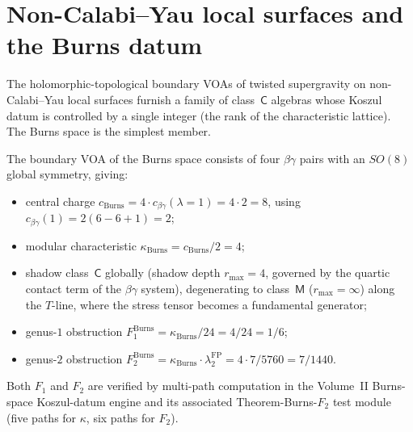 \section{Non-Calabi--Yau local surfaces and the Burns datum}
\label{sec:non-cy-local-surfaces}

The holomorphic-topological boundary VOAs of twisted supergravity
on non-Calabi--Yau local surfaces furnish a family of class~$\mathsf{C}$
algebras whose Koszul datum is controlled by a single integer
\textup{(}the rank of the characteristic lattice\textup{)}. The Burns
space is the simplest member.

\begin{computation}
\label{comp:burns-koszul-datum}
The boundary VOA of the Burns space consists of four $\beta\gamma$
pairs with an $SO(8)$ global symmetry, giving:
\begin{itemize}[nosep]
\item central charge $c_{\mathrm{Burns}}
 = 4 \cdot c_{\beta\gamma}(\lambda{=}1)
 = 4 \cdot 2 = 8$,
 using $c_{\beta\gamma}(1) = 2(6 - 6 + 1) = 2$;
\item modular characteristic
 $\kappa_{\mathrm{Burns}} = c_{\mathrm{Burns}}/2 = 4$;
\item shadow class~$\mathsf{C}$ globally \textup{(}shadow depth
 $r_{\max} = 4$, governed by the quartic contact term of the
 $\beta\gamma$ system\textup{)}, degenerating to class~$\mathsf{M}$
 \textup{(}$r_{\max} = \infty$\textup{)} along the $T$-line, where
 the stress tensor becomes a fundamental generator;
\item genus-$1$ obstruction
 $F_1^{\mathrm{Burns}} = \kappa_{\mathrm{Burns}}/24 = 4/24 = 1/6$;
\item genus-$2$ obstruction
 $F_2^{\mathrm{Burns}} = \kappa_{\mathrm{Burns}} \cdot
 \lambda_2^{\mathrm{FP}} = 4 \cdot 7/5760 = 7/1440$.
\end{itemize}
Both $F_1$ and $F_2$ are verified by multi-path computation in the
Volume~II Burns-space Koszul-datum engine and its associated
Theorem-Burns-$F_2$ test module
\textup{(}five paths for $\kappa$, six paths for $F_2$\textup{)}.
\end{computation}


